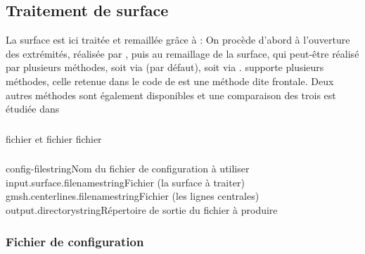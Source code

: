 	\subsection{Traitement de surface}

La surface est ici traitée et remaillée grâce à : On procède d'abord à l'ouverture des extrémités, réalisée par \gmsh, %
 puis au remaillage de la surface, qui peut-être réalisé par plusieurs méthodes, soit via \vmtk (par défaut), soit via \gmsh. \gmsh supporte plusieurs méthodes, celle retenue dans le code de  est une méthode dite frontale. Deux autres méthodes sont également disponibles et une comparaison des trois est étudiée dans \cite{Marchandise2012} %

	\subsubsection{\ioT}
	
\iolist
{fichier \stl et fichier \vtk}
{fichier \stl}
	
	\subsubsection{\argsT}

\args
{config-file}{}{string}{Nom du fichier de configuration à utiliser}
{input.surface.filename}{}{string}{Fichier \stl (la surface à traiter)}
{gmsh.centerlines.filename}{}{string}{Fichier \vtk (les lignes centrales)}
{output.directory}{}{string}{Répertoire de sortie du fichier \stl à produire}
\stoparg

		\subsubsection{Fichier de configuration}

